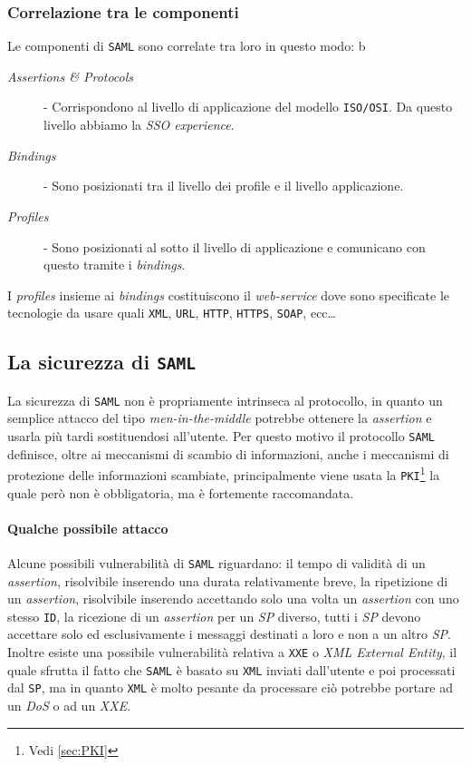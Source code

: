             
        \subsubsection{Correlazione tra le componenti}
            Le componenti di \texttt{SAML} sono correlate tra loro in questo modo: b
            \begin{description}
                \item[\textit{Assertions \& Protocols}] - Corrispondono al livello di applicazione del modello \texttt{ISO/OSI}. Da questo livello abbiamo la \textit{SSO experience}.
                \item[\textit{Bindings}] - Sono posizionati tra il livello dei profile e il livello applicazione.
                \item[\textit{Profiles}] - Sono posizionati al sotto il livello di applicazione e comunicano con questo tramite i \textit{bindings}.
            \end{description}
            I \textit{profiles} insieme ai \textit{bindings} costituiscono il \textit{web-service} dove sono specificate le tecnologie da usare quali \texttt{XML}, \texttt{URL}, \texttt{HTTP}, \texttt{HTTPS}, \texttt{SOAP}, ecc\dots
    \subsection{La sicurezza di \texttt{SAML}}
        La sicurezza di \texttt{SAML} non è propriamente intrinseca al protocollo, in quanto un semplice attacco del tipo \textit{men-in-the-middle} potrebbe ottenere la \textit{assertion} e usarla più tardi sostituendosi all'utente. Per questo motivo il protocollo \texttt{SAML} definisce, oltre ai meccanismi di scambio di informazioni, anche i meccanismi di protezione delle informazioni scambiate, principalmente viene usata la \texttt{PKI}\footnote{Vedi \ref{sec:PKI} } la quale però non è obbligatoria, ma è fortemente raccomandata.
        \paragraph{Qualche possibile attacco} Alcune possibili vulnerabilità di \texttt{SAML} riguardano: il tempo di validità di un \textit{assertion}, risolvibile inserendo una durata relativamente breve, la ripetizione di un \textit{assertion}, risolvibile inserendo accettando solo una volta un \textit{assertion} con uno stesso \texttt{ID}, la ricezione di un \textit{assertion} per un \textit{SP} diverso, tutti i \textit{SP} devono accettare solo ed esclusivamente i messaggi destinati a loro e non a un altro \textit{SP}. Inoltre esiste una possibile vulnerabilità relativa a \texttt{XXE} o \textit{XML External Entity}, il quale sfrutta il fatto che \texttt{SAML} è basato su \texttt{XML} inviati dall'utente e poi processati dal \texttt{SP}, ma in quanto \texttt{XML} è molto pesante da processare ciò potrebbe portare ad un \textit{DoS} o ad un \textit{XXE}.

